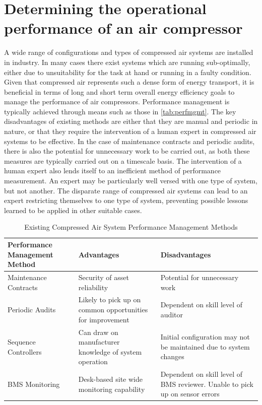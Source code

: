 \section{Determining the operational performance of an air compressor}
\label{sec:probstatement}
A wide range of configurations and types of compressed air systems are installed in industry. In many cases there exist systems which are running sub-optimally, either due to unsuitability for the task at hand or running in a faulty condition. Given that compressed air represents such a dense form of energy transport, it is beneficial in terms of long and short term overall energy efficiency goals to manage the performance of air compressors. Performance management is typically achieved through means such as those in  \autoref{tab:perfmgmt}. The key disadvantages of existing methods are either that they are manual and periodic in nature, or that they require the intervention of a human expert in compressed air systems to be effective. In the case of maintenance contracts and periodic audits, there is also the potential for unnecessary work to be carried out, as both these measures are typically carried out on a timescale basis. The intervention of a human expert also lends itself to an inefficient method of performance measurement. An expert may be particularly well versed with one type of system, but not another. The disparate range of compressed air systems can lead to an expert restricting themselves to one type of system, preventing possible lessons learned to be applied in other suitable cases.

\begin{table}[htbp]
  \centering
  \caption{Existing Compressed Air System Performance Management Methods}
    \begin{tabular}{p{.3\linewidth}p{.3\linewidth}p{.3\linewidth}}
    \toprule
    Performance Management Method & Advantages & Disadvantages \\
    \midrule
    Maintenance Contracts & Security of asset reliability & Potential for unnecessary work \\
    Periodic Audits & Likely to pick up on common opportunities for improvement & Dependent on skill level of auditor \\
    Sequence Controllers & Can draw on manufacturer knowledge of system operation & Initial configuration may not be maintained due to system changes \\
    BMS Monitoring & Desk-based site wide monitoring capability & Dependent on skill level of BMS reviewer. Unable to pick up on sensor errors \\
    \bottomrule
    \end{tabular}%
  \label{tab:perfmgmt}%
\end{table}%


